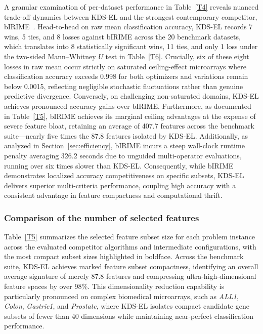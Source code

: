 A granular examination of per-dataset performance in Table~\ref{T4} reveals nuanced trade-off dynamics between KDS-EL and the strongest contemporary competitor, bIRIME~\cite{su2024}. Head-to-head on raw mean classification accuracy, KDS-EL records 7 wins, 5 ties, and 8 losses against bIRIME across the 20 benchmark datasets, which translates into 8 statistically significant wins, 11 ties, and only 1 loss under the two-sided Mann--Whitney $U$ test in Table~\ref{T6}. Crucially, six of these eight losses in raw mean occur strictly on saturated ceiling-effect microarrays where classification accuracy exceeds 0.998 for both optimizers and variations remain below 0.0015, reflecting negligible stochastic fluctuations rather than genuine predictive divergence. Conversely, on challenging non-saturated domains, KDS-EL achieves pronounced accuracy gains over bIRIME. Furthermore, as documented in Table~\ref{T5}, bIRIME achieves its marginal ceiling advantages at the expense of severe feature bloat, retaining an average of 407.7 features across the benchmark suite---nearly five times the 87.8 features isolated by KDS-EL. Additionally, as analyzed in Section~\ref{sec:efficiency}, bIRIME incurs a steep wall-clock runtime penalty averaging 326.2 seconds due to unguided multi-operator evaluations, running over six times slower than KDS-EL. Consequently, while bIRIME demonstrates localized accuracy competitiveness on specific subsets, KDS-EL delivers superior multi-criteria performance, coupling high accuracy with a consistent advantage in feature compactness and computational thrift.

\subsubsection{Comparison of the number of selected features}\label{sec:features}

Table~\ref{T5} summarizes the selected feature subset size for each problem instance across the evaluated competitor algorithms and intermediate configurations, with the most compact subset sizes highlighted in boldface. Across the benchmark suite, KDS-EL achieves marked feature subset compactness, identifying an overall average signature of merely 87.8 features and compressing ultra-high-dimensional feature spaces by over 98\%. This dimensionality reduction capability is particularly pronounced on complex biomedical microarrays, such as \textit{ALL1}, \textit{Colon}, \textit{Gastric1}, and \textit{Prostate}, where KDS-EL isolates compact candidate gene subsets of fewer than 40 dimensions while maintaining near-perfect classification performance.

